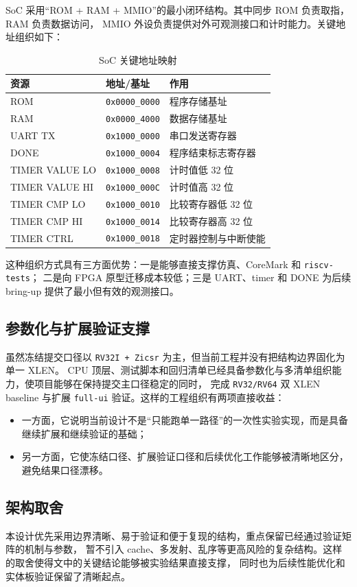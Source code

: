 SoC 采用“ROM + RAM + MMIO”的最小闭环结构。其中同步 ROM 负责取指，RAM 负责数据访问，
MMIO 外设负责提供对外可观测接口和计时能力。关键地址组织如下：
\begin{table}[H]
    \centering
    \caption{SoC 关键地址映射}
    \small
    \begin{tabularx}{0.95\textwidth}{L{0.27\textwidth} L{0.23\textwidth} Y}
        \toprule
        资源 & 地址/基址 & 作用 \\
        \midrule
        ROM & \texttt{0x0000\_0000} & 程序存储基址 \\
        RAM & \texttt{0x0000\_4000} & 数据存储基址 \\
        UART TX & \texttt{0x1000\_0000} & 串口发送寄存器 \\
        DONE & \texttt{0x1000\_0004} & 程序结束标志寄存器 \\
        TIMER VALUE LO & \texttt{0x1000\_0008} & 计时值低 32 位 \\
        TIMER VALUE HI & \texttt{0x1000\_000C} & 计时值高 32 位 \\
        TIMER CMP LO & \texttt{0x1000\_0010} & 比较寄存器低 32 位 \\
        TIMER CMP HI & \texttt{0x1000\_0014} & 比较寄存器高 32 位 \\
        TIMER CTRL & \texttt{0x1000\_0018} & 定时器控制与中断使能 \\
        \bottomrule
    \end{tabularx}
\end{table}

这种组织方式具有三方面优势：一是能够直接支撑仿真、CoreMark 和 \texttt{riscv-tests}；
二是向 FPGA 原型迁移成本较低；三是 UART、timer 和 DONE 为后续 bring-up 提供了最小但有效的观测接口。

\subsection{参数化与扩展验证支撑}

虽然冻结提交口径以 \texttt{RV32I + Zicsr} 为主，但当前工程并没有把结构边界固化为单一 XLEN。
CPU 顶层、测试脚本和回归清单已经具备参数化与多清单组织能力，使项目能够在保持提交主口径稳定的同时，
完成 \texttt{RV32/RV64} 双 XLEN baseline 与扩展 \texttt{full-ui} 验证。这样的工程组织有两项直接收益：
\begin{itemize}
    \item 一方面，它说明当前设计不是“只能跑单一路径”的一次性实验实现，而是具备继续扩展和继续验证的基础；
    \item 另一方面，它使冻结口径、扩展验证口径和后续优化工作能够被清晰地区分，避免结果口径漂移。
\end{itemize}

\subsection{架构取舍}

本设计优先采用边界清晰、易于验证和便于复现的结构，重点保留已经通过验证矩阵的机制与参数，
暂不引入 cache、多发射、乱序等更高风险的复杂结构。这样的取舍使得文中的关键结论能够被实验结果直接支撑，
同时也为后续性能优化和实体板验证保留了清晰起点。
